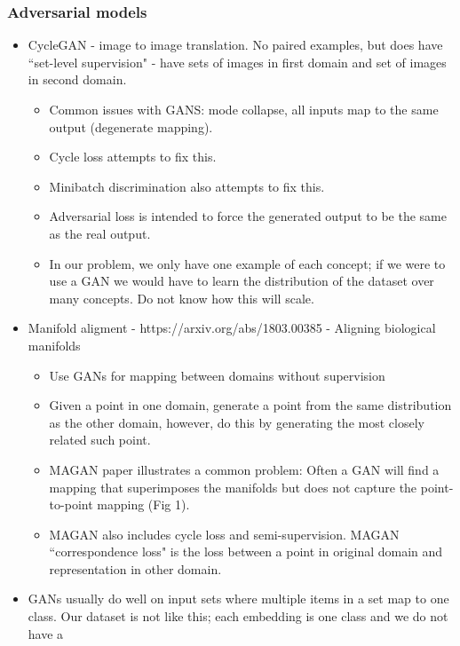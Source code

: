 \subsubsection{Adversarial models}
\begin{itemize}
    \item CycleGAN \cite{CycleGAN} - image to image translation. No paired examples, but does have ``set-level supervision" - have sets of images in first domain and set of images in second domain. 
    \begin{itemize}
        \item Common issues with GANS: mode collapse, all inputs map to the same output (degenerate mapping).
        \item Cycle loss attempts to fix this. 
        \item Minibatch discrimination also attempts to fix this. 
        \item Adversarial loss is intended to force the generated output to be the same as the real output. 
        \item In our problem, we only have one example of each concept; if we were to use a GAN we would have to learn the distribution of the dataset over many concepts. Do not know how this will scale. 
    \end{itemize}
    \item Manifold aligment - https://arxiv.org/abs/1803.00385 - Aligning biological manifolds
        \begin{itemize}
            \item Use GANs for mapping between domains without supervision
            \item Given a point in one domain, generate a point from the same distribution as the other domain, however, do this by generating the most closely related such point.
            \item MAGAN paper illustrates a common problem: Often a GAN will find a mapping that superimposes the manifolds but does not capture the point-to-point mapping (Fig 1). 
            \item MAGAN also includes cycle loss and semi-supervision.  MAGAN ``correspondence loss" is the loss between a point in original domain and representation in other domain. 
        \end{itemize}
    \item GANs usually do well on input sets where multiple items in a set map to one class. Our dataset is not like this; each embedding is one class and we do not have a 
\end{itemize}



